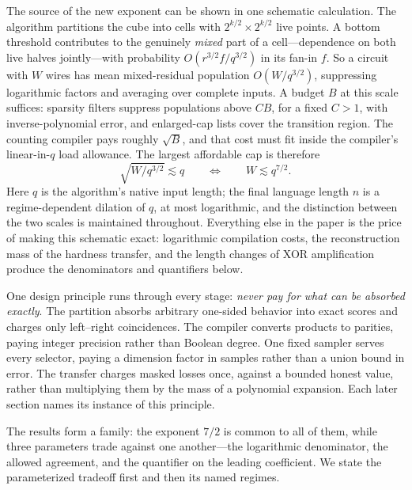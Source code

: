 \documentclass[11pt,letterpaper]{article}
\theoremstyle{definition}
\theoremstyle{remark}
\begin{document}
The source of the new exponent can be shown in one schematic
calculation. The algorithm partitions the cube into cells with
$2^{k/2}\times2^{k/2}$ live points. A bottom threshold contributes to
the genuinely \emph{mixed} part of a cell---dependence on both live
halves jointly---with probability $O(r^{3/2}f/q^{3/2})$ in its fan-in
$f$. So a circuit with $W$ wires has mean mixed-residual population
$O(W/q^{3/2})$, suppressing logarithmic factors and averaging over
complete inputs. A budget $B$ at this scale suffices: sparsity filters
suppress populations above $CB$, for a fixed $C>1$, with
inverse-polynomial error, and enlarged-cap lists cover the transition
region. The counting compiler pays roughly $\sqrt B$, and that cost
must fit inside the compiler's linear-in-$q$ load allowance. The
largest affordable cap is therefore
\[
\sqrt{W/q^{3/2}}\lesssim q
\qquad\Longleftrightarrow\qquad
W\lesssim q^{7/2}.
\]
Here $q$ is the algorithm's native input length; the final language
length $n$ is a regime-dependent dilation of $q$, at most logarithmic,
and the distinction between the two scales is maintained throughout.
Everything else in the paper is the price of
making this schematic exact: logarithmic compilation costs, the
reconstruction mass of the hardness transfer, and the length changes
of XOR amplification produce the denominators and quantifiers below.

One design principle runs through every stage: \emph{never pay for
what can be absorbed exactly}. The partition absorbs arbitrary
one-sided behavior into exact scores and charges only left--right
coincidences. The compiler converts products to parities, paying
integer precision rather than Boolean degree. One fixed sampler
serves every selector, paying a dimension factor in samples rather
than a union bound in error. The transfer charges masked losses once,
against a bounded honest value, rather than multiplying them by the
mass of a polynomial expansion. Each later section names its instance
of this principle.

The results form a family: the exponent $7/2$ is common to all of
them, while three parameters trade against one another---the
logarithmic denominator, the allowed agreement, and the quantifier on
the leading coefficient. We state the parameterized tradeoff first
and then its named regimes.
\end{document}
